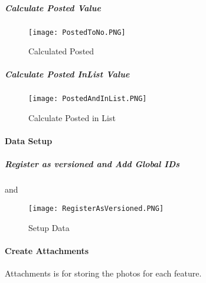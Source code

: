 \subparagraph{Calculate Posted Value}   
   
  \begin{figure}[h!]
 \centering
     \texttt{[image: PostedToNo.PNG]}
 \caption{Calculated Posted}
 \end{figure} 
   
   
\subparagraph{Calculate Posted InList Value}   
   
  \begin{figure}[h!]
 \centering
     \texttt{[image: PostedAndInList.PNG]}
 \caption{Calculate Posted in List}
 \end{figure} 
   
   
\clearpage
   
   
   
   
   
   
   
   
   
   
 \paragraph{Data Setup}
 \vspace{.2in}

\subparagraph{Register as versioned and Add Global IDs} 
 

 \vspace{.2in}

 \vspace{.2in}

 and
 \vspace{.2in}

 \vspace{.2in}

 \begin{figure}[h!]
 \centering
     \texttt{[image: RegisterAsVersioned.PNG]}
 \caption{Setup Data}
 \end{figure}
 \clearpage
 \paragraph[Create Attachments]{\Large Create Attachments\texorpdfstring{\\}{}}
Attachments is for storing the photos for each feature.

 \vspace{.3in}

